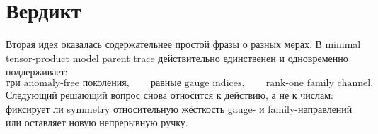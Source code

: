 \documentclass[12pt,a4paper]{article}
\begin{document}
\section{Вердикт}

Вторая идея оказалась содержательнее простой фразы о разных мерах. В minimal tensor-product model parent trace действительно единственен и одновременно поддерживает:
\[
\text{три anomaly-free поколения},
\qquad
\text{равные gauge indices},
\qquad
\text{rank-one family channel}.
\]
Следующий решающий вопрос снова относится к действию, а не к числам: фиксирует ли symmetry относительную жёсткость gauge- и family-направлений или оставляет новую непрерывную ручку.
\end{document}
